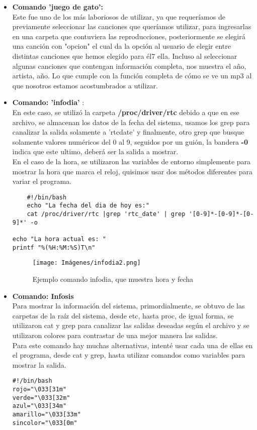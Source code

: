\documentclass[letterpaper,12pt]{article} %
\begin{document}
\begin{itemize}
     \item \textbf{Comando 'juego de gato':} \\
    Este fue uno de los más laboriosos de utilizar, ya que requeríamos de previamente seleccionar las canciones que queríamos utilizar, para ingresarlas en una carpeta que contuviera las reproducciones, posteriormente se elegirá una canción con "opcion" el cual da la opción al usuario de elegir entre distintas canciones que hemos elegido para él7 ella. 
    Incluso al seleccionar algunas canciones que contengan información completa, nos muestra el año, artista, año. 
    Lo que cumple con la función completa de cómo se ve un mp3 al que nosotros estamos acostumbrados a utilizar. 
    
    \item \textbf{Comando: 'infodia' }:\\ En este caso, se utilizó la carpeta \textbf{/proc/driver/rtc} debido a que en ese archivo, se almacenan los datos de la fecha del sistema, usamos los grep para canalizar la salida solamente a 'rtcdate' y finalmente, otro grep que busque solamente valores numéricos del 0 al 9, seguidos por un guión, la bandera \textbf{-0} indica que este ultimo, deberá ser la salida a mostrar.\\
    En el caso de la hora, se utilizaron las variables de entorno simplemente para mostrar la hora que marca el reloj, quisimos usar dos métodos diferentes para variar el programa.\\
    
    \begin{lstlisting}
    #!/bin/bash
    echo "La fecha del dia de hoy es:"
    cat /proc/driver/rtc |grep 'rtc_date' | grep '[0-9]*-[0-9]*-[0-9]*' -o

echo "La hora actual es: "
printf "%(%H:%M:%S)T\n"
    \end{lstlisting}

\begin{figure}[H]
\caption{Ejemplo comando infodia, que muestra hora y fecha}
\centering
\texttt{[image: Imágenes/infodia2.png]}
\end{figure}


     \item \textbf{Comando: Infosis}\\ 
     Para mostrar la información del sistema, primordialmente, se obtuvo de las carpetas de la raíz del sistema, desde etc, hasta proc, de igual forma, se utilizaron cat y grep para canalizar las salidas deseadas según el archivo y se utilizaron colores para contrastar de una mejor manera las salidas.\\
     Para este comando hay muchas alternativas, intenté usar cada una de ellas en el programa, desde cat y grep, hasta utilizar comandos como variables para mostrar la salida.
       \begin{lstlisting}
#!/bin/bash
rojo="\033[31m"
verde="\033[32m"
azul="\033[34m"
amarillo="\033[33m"
sincolor="\033[0m"


\end{lstlisting}
\end{itemize}
\end{document}
